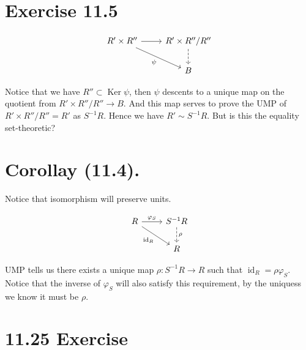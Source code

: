
\section{Exercise 11.5}

\[\begin{tikzcd}
	{R'\times R''} & {R'\times R''/R''} \\
	& B
	\arrow[from=1-1, to=1-2]
	\arrow["\psi"', from=1-1, to=2-2]
	\arrow[dashed, from=1-2, to=2-2]
\end{tikzcd}\]

Notice that we have $R''\subset \operatorname{Ker}\psi$, then $\psi$ descents to a unique map on the quotient from $R'\times R''/R''\to B$. And this map serves to prove the UMP of $R'\times R''/R''=R'$ as $S^{-1}R$. Hence we have $R'\sim S^{-1}R$. But is this the equality set-theoretic?

\section{Corollay (11.4).}

Notice that isomorphism will preserve units.

\[\begin{tikzcd}
	R & {S^{-1}R} \\
	& R
	\arrow["{\varphi_S}", from=1-1, to=1-2]
	\arrow["{\operatorname{id}_R}"', from=1-1, to=2-2]
	\arrow["\rho", dashed, from=1-2, to=2-2]
\end{tikzcd}\]

UMP tells us there exists a unique map $\rho:S^{-1}R\to R$ such that $\operatorname{id}_R=\rho\varphi_S$. Notice that the inverse of $\varphi_S$ will also satisfy this requirement, by the uniquess we know it must be $\rho$.


\section{11.25 Exercise}

